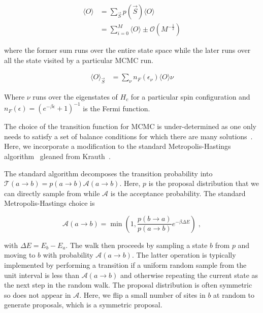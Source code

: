 \[\begin{aligned}
\label{eq:thermal_expectation}
\langle O \rangle & = \sum_{\vec{S}} p(\vec{S}) \langle O \rangle\\
                  & = \sum_{i = 0}^{M} \langle O\rangle \pm \mathcal{O}(M^{-\tfrac{1}{2}})
\end{aligned}\]

where the former sum runs over the entire state space while the later runs over all the state visited by a particular MCMC run.

\[\begin{aligned}
\langle O \rangle_{\vec{S}}& = \sum_{\nu} n_F(\epsilon_{\nu}) \langle O \rangle{\nu}
\end{aligned}\]

Where \(\nu\) runs over the eigenstates of \(H_c\) for a particular spin configuration and \(n_F(\epsilon) = \left(e^{-\beta\epsilon} + 1\right)^{-1}\) is the Fermi function.

The choice of the transition function for MCMC is under-determined as one only needs to satisfy a set of balance conditions for which there are many solutions~\autocite{kellyReversibilityStochasticNetworks1981}. Here, we incorporate a modification to the standard Metropolis-Hastings algorithm~\autocite{hastingsMonteCarloSampling1970} gleaned from Krauth~\autocite{krauthIntroductionMonteCarlo1998}.

The standard algorithm decomposes the transition probability into \(\mathcal{T}(a \to b) = p(a \to b)\mathcal{A}(a \to b)\). Here, \(p\) is the proposal distribution that we can directly sample from while \(\mathcal{A}\) is the acceptance probability. The standard Metropolis-Hastings choice is

\[\mathcal{A}(a \to b) = \min\left(1, \frac{p(b\to a)}{p(a\to b)} e^{-\beta \Delta E}\right)\;,\]

with \(\Delta E = E_b - E_a\). The walk then proceeds by sampling a state \(b\) from \(p\) and moving to \(b\) with probability \(\mathcal{A}(a \to b)\). The latter operation is typically implemented by performing a transition if a uniform random sample from the unit interval is less than \(\mathcal{A}(a \to b)\) and otherwise repeating the current state as the next step in the random walk. The proposal distribution is often symmetric so does not appear in \(\mathcal{A}\). Here, we flip a small number of sites in \(b\) at random to generate proposals, which is a symmetric proposal.

